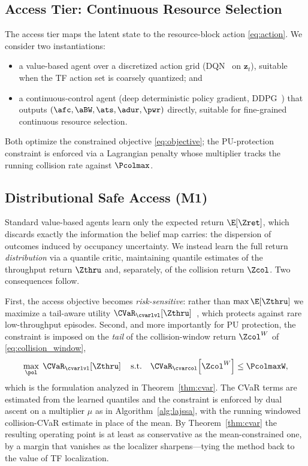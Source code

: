 \subsection{Access Tier: Continuous Resource Selection}
\label{subsec:access_tier}
The access tier maps the latent state to the resource-block action
\eqref{eq:action}. We consider two instantiations:
\begin{itemize}
\item a value-based agent over a discretized action grid (DQN~\cite{hausknecht2015drqn}
on $\bm{z}_t$), suitable when the TF action set is coarsely quantized; and
\item a continuous-control agent (deep deterministic policy gradient,
DDPG~\cite{lillicrap2016ddpg}) that
outputs $(\afc,\aBW,\ats,\adur,\pwr)$ directly, suitable for fine-grained
continuous resource selection.
\end{itemize}
Both optimize the constrained objective \eqref{eq:objective}; the
PU-protection constraint is enforced via a Lagrangian penalty whose
multiplier tracks the running collision rate against $\Pcolmax$.

\subsection{Distributional Safe Access (M1)}
\label{subsec:dist_rl}
Standard value-based agents learn only the expected return $\E[\Zret]$, which
discards exactly the information the belief map carries: the dispersion of
outcomes induced by occupancy uncertainty. We instead learn the full return
\emph{distribution} via a quantile critic, maintaining quantile estimates of
the throughput return $\Zthru$ and, separately, of the collision return
$\Zcol$. Two consequences follow.

First, the access objective becomes \emph{risk-sensitive}: rather than
$\max\E[\Zthru]$ we maximize a tail-aware utility
$\CVaR_{\cvarlvl}[\Zthru]$~\cite{rockafellar2000cvar}, which protects against rare low-throughput
episodes. Second, and more importantly for PU protection, the constraint is
imposed on the \emph{tail} of the collision-window return $\Zcol^{W}$ of
\eqref{eq:collision_window},
\begin{equation}
\max_{\pol}\;\CVaR_{\cvarlvl}\!\left[\Zthru\right]
\quad\text{s.t.}\quad
\CVaR_{\cvarcol}\!\left[\Zcol^{W}\right]\le\PcolmaxW,
\label{eq:cvar_objective}
\end{equation}
which is the formulation analyzed in Theorem~\ref{thm:cvar}. The CVaR terms
are estimated from the learned quantiles and the constraint is enforced by
dual ascent on a multiplier $\mu$ as in Algorithm~\ref{alg:lajssa}, with the
running windowed collision-CVaR estimate in place of the mean. By
Theorem~\ref{thm:cvar} the resulting operating point is at least as
conservative as the mean-constrained one, by a margin that vanishes as the
localizer sharpens---tying the method back to the value of TF localization.


